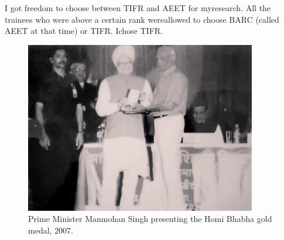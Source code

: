 I got freedom to choose between TIFR and AEET for my\break research. All the 
trainees who were above a certain rank were\break allowed to choose BARC 
(called AEET at that time) or TIFR. I\break chose TIFR.
\smallskip

\begin{figure}[H]
\centering
\includegraphics[width=0.9\textwidth]{images/Rajaji-04.jpg}
\caption{\small{Prime Minister Manmohan Singh presenting the Homi Bhabha
gold medal, 2007.}}
\end{figure}

